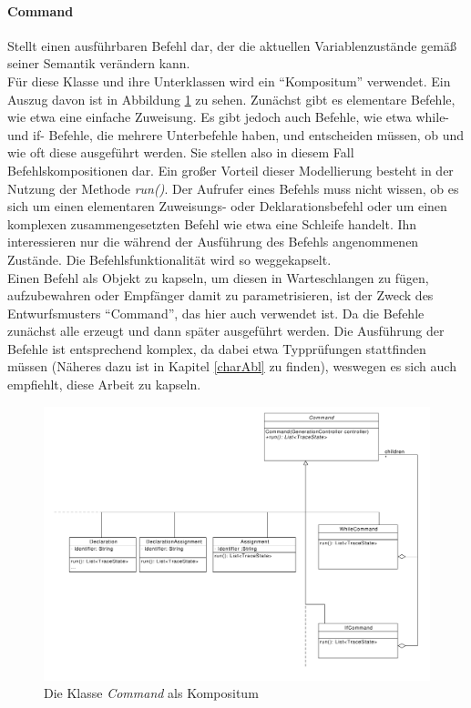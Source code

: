 \documentclass[parskip=full]{scrartcl}
\begin{document}
\paragraph{Command}
Stellt einen ausführbaren Befehl dar, der die aktuellen Variablenzustände gemäß seiner Semantik verändern kann.
\\
Für diese Klasse und ihre Unterklassen wird ein \enquote{Kompositum} verwendet.
Ein Auszug davon ist in Abbildung \ref{Command} zu sehen. Zunächst gibt es elementare Befehle, wie etwa eine einfache Zuweisung. Es gibt jedoch auch Befehle, wie etwa while- und if- Befehle, die mehrere Unterbefehle haben, und entscheiden müssen, ob und wie oft diese ausgeführt werden. Sie stellen also in diesem Fall Befehlskompositionen dar. Ein großer Vorteil dieser Modellierung besteht in der Nutzung der Methode \textit{run()}. Der Aufrufer eines Befehls muss nicht wissen, ob es sich um einen elementaren Zuweisungs- oder Deklarationsbefehl oder um einen komplexen zusammengesetzten Befehl wie etwa eine Schleife handelt. Ihn interessieren nur die während der Ausführung des Befehls angenommenen Zustände. Die Befehlsfunktionalität wird so weggekapselt. \\
Einen Befehl als Objekt zu kapseln, um diesen in Warteschlangen zu fügen, aufzubewahren oder Empfänger damit zu parametrisieren, ist der Zweck des Entwurfsmusters \enquote{Command}, das hier auch verwendet ist. Da die Befehle zunächst alle erzeugt und dann später ausgeführt werden. Die Ausführung der Befehle ist entsprechend komplex, da dabei etwa Typprüfungen stattfinden müssen (Näheres dazu ist in Kapitel \ref{charAbl} zu finden), weswegen es sich auch empfiehlt, diese Arbeit zu kapseln. 
\begin{figure}[!h]
\centering
\includegraphics[width=1.0\textwidth]{diagrammIdeenUmlet/CommandComposite.pdf}
\caption{Die Klasse \textit{Command} als Kompositum}
\label{Command}
\end{figure}
\end{document}
